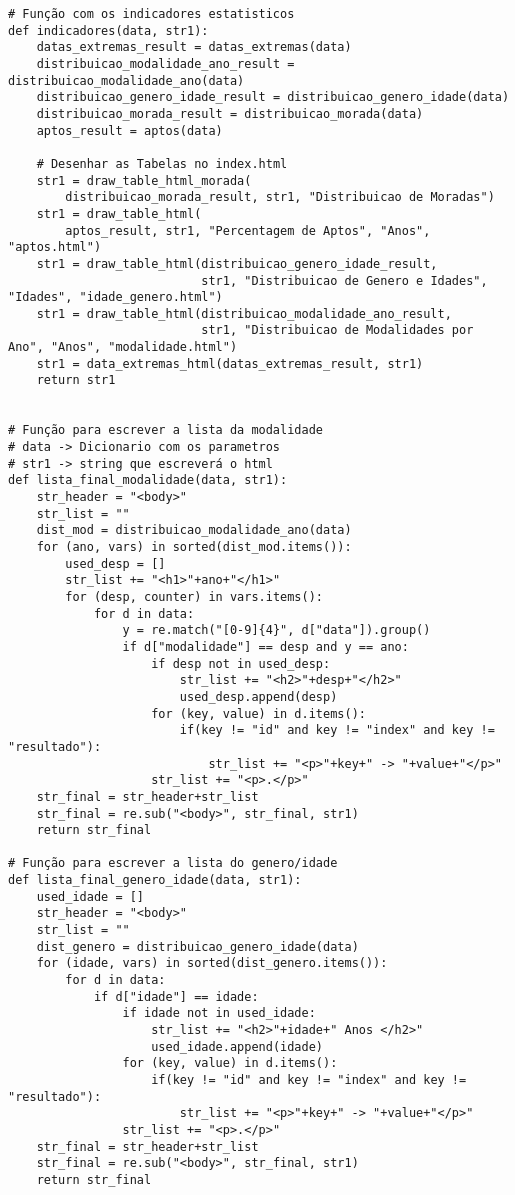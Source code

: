 \documentclass[11pt,a4paper]{report}%
\begin{document}
\begin{verbatim}
# Função com os indicadores estatisticos
def indicadores(data, str1):
    datas_extremas_result = datas_extremas(data)
    distribuicao_modalidade_ano_result = distribuicao_modalidade_ano(data)
    distribuicao_genero_idade_result = distribuicao_genero_idade(data)
    distribuicao_morada_result = distribuicao_morada(data)
    aptos_result = aptos(data)

    # Desenhar as Tabelas no index.html
    str1 = draw_table_html_morada(
        distribuicao_morada_result, str1, "Distribuicao de Moradas")
    str1 = draw_table_html(
        aptos_result, str1, "Percentagem de Aptos", "Anos", "aptos.html")
    str1 = draw_table_html(distribuicao_genero_idade_result,
                           str1, "Distribuicao de Genero e Idades", "Idades", "idade_genero.html")
    str1 = draw_table_html(distribuicao_modalidade_ano_result,
                           str1, "Distribuicao de Modalidades por Ano", "Anos", "modalidade.html")
    str1 = data_extremas_html(datas_extremas_result, str1)
    return str1


# Função para escrever a lista da modalidade
# data -> Dicionario com os parametros
# str1 -> string que escreverá o html
def lista_final_modalidade(data, str1):
    str_header = "<body>"
    str_list = ""
    dist_mod = distribuicao_modalidade_ano(data)
    for (ano, vars) in sorted(dist_mod.items()):
        used_desp = []
        str_list += "<h1>"+ano+"</h1>"
        for (desp, counter) in vars.items():
            for d in data:
                y = re.match("[0-9]{4}", d["data"]).group()
                if d["modalidade"] == desp and y == ano:
                    if desp not in used_desp:
                        str_list += "<h2>"+desp+"</h2>"
                        used_desp.append(desp)
                    for (key, value) in d.items():
                        if(key != "id" and key != "index" and key != "resultado"):
                            str_list += "<p>"+key+" -> "+value+"</p>"
                    str_list += "<p>.</p>"
    str_final = str_header+str_list
    str_final = re.sub("<body>", str_final, str1)
    return str_final

# Função para escrever a lista do genero/idade
def lista_final_genero_idade(data, str1):
    used_idade = []
    str_header = "<body>"
    str_list = ""
    dist_genero = distribuicao_genero_idade(data)
    for (idade, vars) in sorted(dist_genero.items()):
        for d in data:
            if d["idade"] == idade:
                if idade not in used_idade:
                    str_list += "<h2>"+idade+" Anos </h2>"
                    used_idade.append(idade)
                for (key, value) in d.items():
                    if(key != "id" and key != "index" and key != "resultado"):
                        str_list += "<p>"+key+" -> "+value+"</p>"
                str_list += "<p>.</p>"
    str_final = str_header+str_list
    str_final = re.sub("<body>", str_final, str1)
    return str_final


\end{verbatim}
\end{document}
